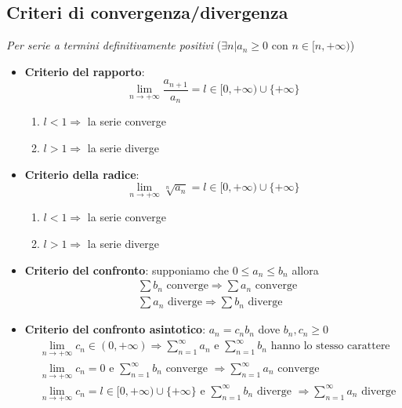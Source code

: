 \documentclass[12pt, a4paper]{article}
\begin{document}
    \subsection{Criteri di convergenza/divergenza}
        \textit{Per serie a termini definitivamente positivi} ($\exists n | a_n\geq 0 \text{ con }n\in[n,+\infty)$)
        \begin{itemize}
            \item \textbf{Criterio del rapporto}: \begin{equation*}
                \lim_{n\rightarrow +\infty}\frac{a_{n+1}}{a_n} = l \in [0,+\infty)\cup\{+\infty\}
            \end{equation*} \begin{enumerate}
                \item $l<1\Rightarrow$ la serie converge
                \item $l>1\Rightarrow$ la serie diverge
            \end{enumerate}
            \item \textbf{Criterio della radice}: \begin{equation*}
                \lim_{n\rightarrow+\infty}\sqrt[n]{a_n} = l \in [0,+\infty)\cup\{+\infty\}
            \end{equation*} \begin{enumerate}
                \item $l<1\Rightarrow$ la serie converge
                \item $l>1\Rightarrow$ la serie diverge
            \end{enumerate}
            \item \textbf{Criterio del confronto}: supponiamo che $0\leq a_n\leq b_n$ allora \begin{equation*}
                \begin{split}
                    &\sum b_n \text{ converge} \Rightarrow \sum a_n \text{ converge}\\
                    &\sum a_n \text{ diverge} \Rightarrow \sum b_n \text{ diverge}
                \end{split}
            \end{equation*}
            \item \textbf{Criterio del confronto asintotico}: $a_n=c_nb_n$ dove $b_n,c_n\geq 0$ \begin{equation*}
                \begin{split}
                    &\lim_{n\rightarrow +\infty}c_n \in (0,+\infty) \Rightarrow \sum_{n=1}^{\infty}a_n \text{ e } \sum_{n=1}^{\infty}b_n \text{ hanno lo stesso carattere}\\
                    &\lim_{n\rightarrow +\infty}c_n = 0 \text{ e } \sum_{n=1}^{\infty}b_n \text{ converge } \Rightarrow \sum_{n=1}^{\infty}a_n \text{ converge}\\
                    &\lim_{n\rightarrow +\infty}c_n = l\in[0,+\infty)\cup\{+\infty\} \text{ e } \sum_{n=1}^{\infty}b_n \text{ diverge } \Rightarrow \sum_{n=1}^{\infty}a_n \text{ diverge}
                \end{split}
            \end{equation*}
        \end{itemize}
\end{document}
